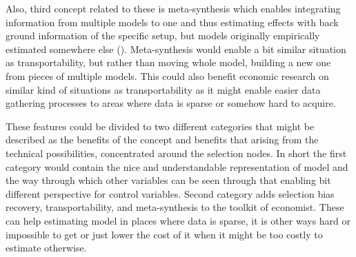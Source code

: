 \documentclass[main=english,12pt,a4paper,pdftex,econ,utf8]{aaltothesis}
\begin{document}
Also, third concept related to these is meta-synthesis which enables integrating information from multiple models to one and thus estimating effects with back ground information of the specific setup, but models originally empirically estimated somewhere else (\cite{Pearl2012a}). Meta-synthesis would enable a bit similar situation as transportability, but rather than moving whole model, building a new one from pieces of multiple models. This could also benefit economic research on similar kind of situations as transportability as it might enable easier data gathering processes to areas where data is sparse or somehow hard to acquire.

These features could be divided to two different categories that might be described as the benefits of the concept and benefits that arising from the technical possibilities, concentrated around the selection nodes. In short the first category would contain the nice and understandable representation of model and the way through which other variables can be seen through that enabling bit different perspective for control variables. Second category adds selection bias recovery, transportability, and meta-synthesis to the toolkit of economist. These can help estimating model in places where data is sparse, it is other ways hard or impossible to get or just lower the cost of it when it might be too costly to estimate otherwise.

\begin{comment}
\hl{These} would enable using once done model in some place that must have same causal structure, but there might be some factors affecting the estimates differing from the original location to be used also in the second place. This would of course be again highly useful for economics and as selection recovery this might make implementing models for different settings much cheaper and thus also possible in smaller settings which might enable better policy recommendation and better decision making for smaller units such as municipalities. Also some complicated questions like how the social security system should be renewed in could be assessed more carefully with perhaps some research done in fairly similar setting in other country. Even thought this seems very promising and usable this is of course no silver bullet solving every problem. Even though there might be interesting use cases this requires the causal structure being exactly same to retain the causal interpretation and exactly same causal structures are of course in real world very hard to find.
\end{comment}
\end{document}
